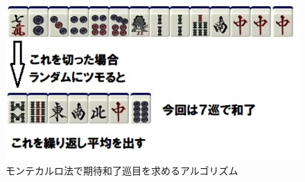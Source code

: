 \begin{figure}[h]
 \centering
 \includegraphics[keepaspectratio, scale=1,bb=0 0 300 200]
      {img/monte1.jpg}
 \caption{モンテカルロ法で期待和了巡目を求めるアルゴリズム}
 \label{monte1}
\end{figure}














